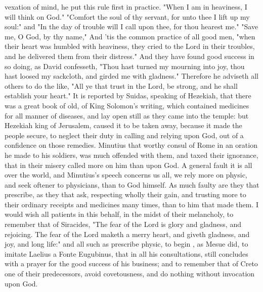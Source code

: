 {vexation of mind, he put this rule first in practice.  "When I am in heaviness, I will think on God."  "Comfort the soul of thy servant, for unto thee I lift up my
soul:" and  "In the day of trouble will I call upon thee, for
thou hearest me."  "Save me, O God, by thy name,"
\etc{}  And 'tis the common practice
of all good men,  "when their heart was humbled
with heaviness, they cried to the Lord in their troubles, and he delivered them
from their distress." And they have found good success in so doing, as David
confesseth,  "Thou hast turned my mourning into
joy, thou hast loosed my sackcloth, and girded me with gladness." Therefore he
adviseth all others to do the like,  "All ye that
trust in the Lord, be strong, and he shall establish your heart." It is
reported by Suidas, speaking of Hezekiah, that there was a
great book of old, of King Solomon's writing, which contained medicines for all
manner of diseases, and lay open still as they came into the temple: but
Hezekiah king of Jerusalem, caused it to be taken away, because it made the
people secure, to neglect their duty in calling and relying upon God, out of a
confidence on those remedies. Minutius that worthy consul
of Rome in an oration he made to his soldiers, was much offended with them, and
taxed their ignorance, that in their misery called more on him than upon God. A
general fault it is all over the world, and Minutius's speech concerns us all,
we rely more on physic, and seek oftener to physicians, than to God himself. As
much faulty are they that prescribe, as they that ask, respecting wholly their
gain, and trusting more to their ordinary receipts and medicines many times,
than to him that made them. I would wish all patients in this behalf, in the
midst of their melancholy, to remember that of Siracides,  "The fear of the Lord is glory and gladness, and rejoicing. The
fear of the Lord maketh a merry heart, and giveth gladness, and joy, and long
life:" and all such as prescribe physic, to begin , as
Mesue did, to imitate Laelius a Fonte Eugubinus, that in
all his consultations, still concludes with a prayer for the good success of
his business; and to remember that of Creto one of their predecessors,  avoid
covetousness, and do nothing without invocation upon God.

}
